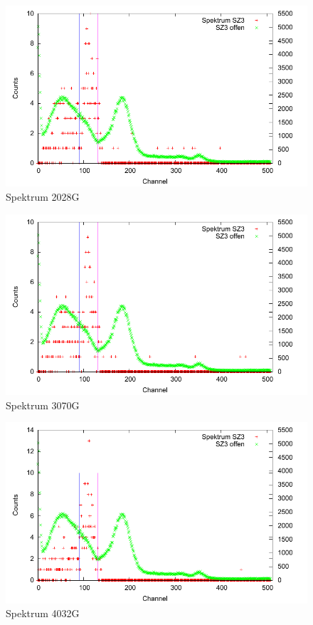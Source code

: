 \begin{figure}
 \includegraphics[width=\textwidth]{Graphen/quench/spektrum_2028.pdf}
 \caption{Spektrum 2028G}
\end{figure}


\begin{figure}
 \includegraphics[width=\textwidth]{Graphen/quench/spektrum_3070.pdf}
 \caption{Spektrum 3070G}
\end{figure}

\begin{figure}
 \includegraphics[width=\textwidth]{Graphen/quench/spektrum_4032.pdf}
 \caption{Spektrum 4032G}
\end{figure}

